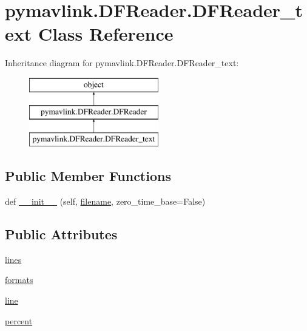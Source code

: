 \hypertarget{classpymavlink_1_1DFReader_1_1DFReader__text}{}\section{pymavlink.\+D\+F\+Reader.\+D\+F\+Reader\+\_\+text Class Reference}
\label{classpymavlink_1_1DFReader_1_1DFReader__text}
Inheritance diagram for pymavlink.\+D\+F\+Reader.\+D\+F\+Reader\+\_\+text\+:\begin{figure}[H]
\begin{center}
\leavevmode
\includegraphics[height=3.000000cm]{classpymavlink_1_1DFReader_1_1DFReader__text}
\end{center}
\end{figure}
\subsection*{Public Member Functions}
\begin{DoxyCompactItemize}
\item 
def \mbox{\hyperlink{classpymavlink_1_1DFReader_1_1DFReader__text_a76e07d046a48e72103c6823ce889c82c}{\+\_\+\+\_\+init\+\_\+\+\_\+}} (self, \mbox{\hyperlink{namespacepymavlink_1_1DFReader_a9653e10b2651c68cf8b171d8dd60f10c}{filename}}, zero\+\_\+time\+\_\+base=False)
\end{DoxyCompactItemize}
\subsection*{Public Attributes}
\begin{DoxyCompactItemize}
\item 
\mbox{\hyperlink{classpymavlink_1_1DFReader_1_1DFReader__text_a1c5eb70b7d8eacfbd8a3a5187755d95d}{lines}}
\item 
\mbox{\hyperlink{classpymavlink_1_1DFReader_1_1DFReader__text_ab35c6d78779a3b0f8bd472db02012b15}{formats}}
\item 
\mbox{\hyperlink{classpymavlink_1_1DFReader_1_1DFReader__text_a3d7b847a7d16c3bd1875fe17c7e5659a}{line}}
\item 
\mbox{\hyperlink{classpymavlink_1_1DFReader_1_1DFReader__text_aa93b2a84c631703bcbcffdbdc69898e4}{percent}}
\end{DoxyCompactItemize}


